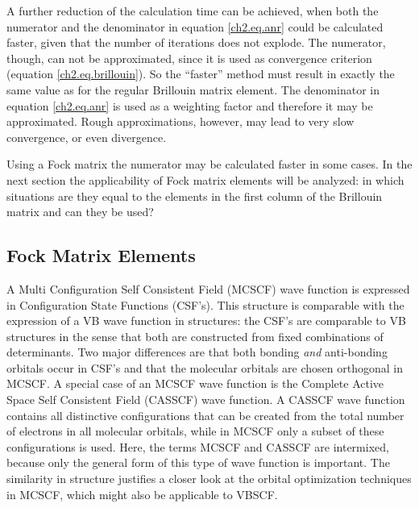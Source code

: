 A further reduction of the calculation time can be achieved, when both the numerator and the denominator in equation \ref{ch2.eq.anr} could be calculated faster, given that the number of iterations does not explode. The numerator, though, can not be approximated, since it is used as convergence criterion (equation \ref{ch2.eq.brillouin}). So the ``faster'' method must result in exactly the same value as for the regular Brillouin matrix element. The denominator in equation \ref{ch2.eq.anr} is used as a weighting factor and therefore it may be approximated. Rough approximations, however, may lead to very slow convergence, or even divergence. 

Using a Fock matrix the numerator may be calculated faster in some cases. In the next section the applicability of Fock matrix elements will be analyzed: in which situations are they equal to the elements in the first column of the Brillouin matrix and can they be used?

\subsection{\label{ch2.sec.fock}Fock Matrix Elements} 

A Multi Configuration Self Consistent Field (MCSCF) \cite{wahldasbook,daswahl} wave function is expressed in Configuration State Functions (CSF's). This structure is comparable with the expression of a VB wave function in structures: the CSF's are comparable to VB structures in the sense that both are constructed from fixed combinations of determinants. Two major differences are that both bonding \textit{and} anti-bonding orbitals occur in CSF's and that the molecular orbitals are chosen orthogonal in MCSCF. A special case of an MCSCF wave function is the Complete Active Space Self Consistent Field (CASSCF) wave function. A CASSCF wave function contains all distinctive configurations that can be created from the total number of electrons in all molecular orbitals, while in MCSCF only a subset of these configurations is used. Here, the terms MCSCF and CASSCF are intermixed, because only the general form of this type of wave function is important. The similarity in structure justifies a closer look at the orbital optimization techniques in MCSCF, which might also be applicable to VBSCF.

